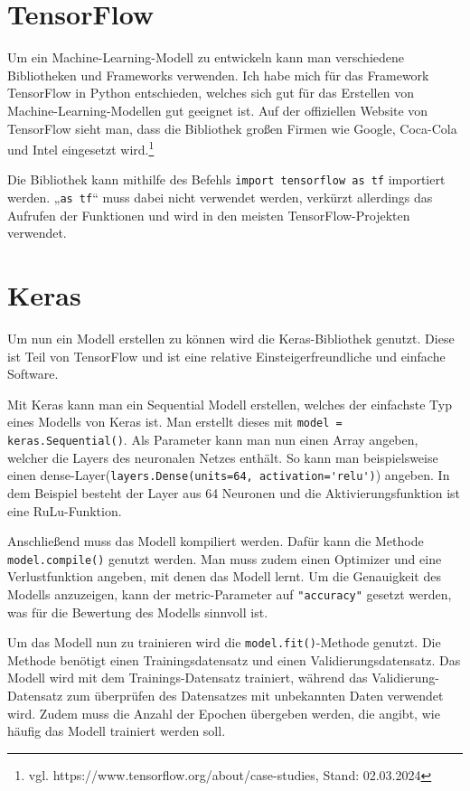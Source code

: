 \documentclass[11pt,oneside]{report}
\begin{document}
\section{TensorFlow}
Um ein Machine-Learning-Modell zu entwickeln kann man verschiedene Bibliotheken und Frameworks verwenden. Ich habe mich für das Framework TensorFlow in Python entschieden, welches sich gut für das Erstellen von Machine-Learning-Modellen gut geeignet ist. Auf der offiziellen Website von TensorFlow sieht man, dass die Bibliothek großen Firmen wie Google, Coca-Cola und Intel eingesetzt wird.\footnote{vgl. https://www.tensorflow.org/about/case-studies, Stand: 02.03.2024}

Die Bibliothek kann mithilfe des Befehls \verb+import tensorflow as tf+ importiert werden. „\verb+as tf+“ muss dabei nicht verwendet werden, verkürzt allerdings das Aufrufen der Funktionen und wird in den meisten TensorFlow-Projekten verwendet.

\section{Keras}
Um nun ein Modell erstellen zu können wird die Keras-Bibliothek genutzt. Diese ist Teil von TensorFlow und ist eine relative Einsteigerfreundliche und einfache Software.

Mit Keras kann man ein Sequential Modell erstellen, welches der einfachste Typ eines Modells von Keras ist. Man erstellt dieses mit \verb+model = keras.Sequential()+. Als Parameter kann man nun einen Array angeben, welcher die Layers des neuronalen Netzes enthält. So kann man beispielsweise einen dense-Layer(\verb+layers.Dense(units=64, activation='relu')+) angeben. In dem Beispiel besteht der Layer aus 64 Neuronen und die Aktivierungsfunktion ist eine RuLu-Funktion.

Anschließend muss das Modell kompiliert werden. Dafür kann die Methode \verb+model.compile()+ genutzt werden. Man muss zudem einen Optimizer und eine Verlustfunktion angeben, mit denen das Modell lernt. Um die Genauigkeit des Modells anzuzeigen, kann der metric-Parameter auf \verb+"accuracy"+ gesetzt werden, was für die Bewertung des Modells sinnvoll ist.

Um das Modell nun zu trainieren wird die \verb+model.fit()+-Methode genutzt. Die Methode benötigt einen Trainingsdatensatz und einen Validierungsdatensatz. Das Modell wird mit dem Trainings-Datensatz trainiert, während das Validierung-Datensatz zum überprüfen des Datensatzes mit unbekannten Daten verwendet wird. Zudem muss die Anzahl der Epochen übergeben werden, die angibt, wie häufig das Modell trainiert werden soll.
\end{document}
